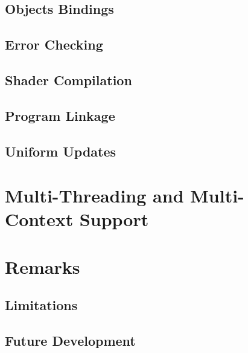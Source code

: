 \documentclass{article}
\begin{document}
\subsection{Objects Bindings}



\subsection{Error Checking}



\subsection{Shader Compilation}

 

\subsection{Program Linkage}



\subsection{Uniform Updates}



\section{Multi-Threading and Multi-Context Support}


\section{Remarks}

\subsection{Limitations}

\subsection{Future Development}
\end{document}
